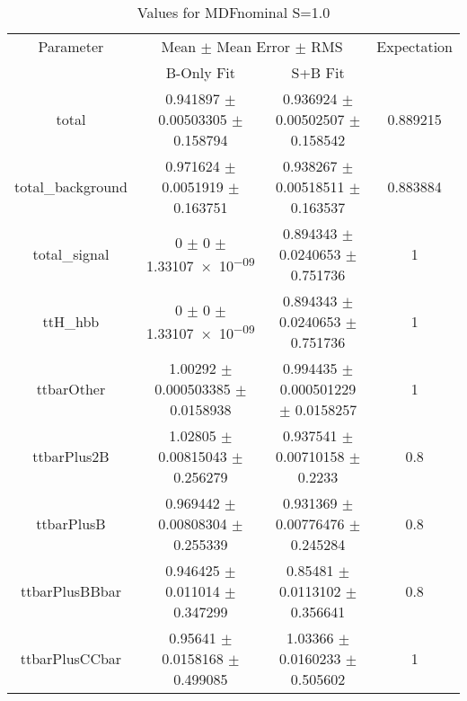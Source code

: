 \begin{table}
\centering
\caption{Values for MDFnominal S=1.0}
\begin{tabular}{cccc}
\toprule
Parameter & \multicolumn{2}{c}{Mean $\pm$ Mean Error $\pm$ RMS} & Expectation\\
 & B-Only Fit & S+B Fit & \\
\midrule
total & \num{0.941897} $\pm$ \num{0.00503305} $\pm$ \num{0.158794} & \num{0.936924} $\pm$ \num{0.00502507} $\pm$ \num{0.158542} & \num{0.889215}\\
total\_background & \num{0.971624} $\pm$ \num{0.0051919} $\pm$ \num{0.163751} & \num{0.938267} $\pm$ \num{0.00518511} $\pm$ \num{0.163537} & \num{0.883884}\\
total\_signal & \num{0} $\pm$ \num{0} $\pm$ \num{1.33107e-09} & \num{0.894343} $\pm$ \num{0.0240653} $\pm$ \num{0.751736} & \num{1}\\
ttH\_hbb & \num{0} $\pm$ \num{0} $\pm$ \num{1.33107e-09} & \num{0.894343} $\pm$ \num{0.0240653} $\pm$ \num{0.751736} & \num{1}\\
ttbarOther & \num{1.00292} $\pm$ \num{0.000503385} $\pm$ \num{0.0158938} & \num{0.994435} $\pm$ \num{0.000501229} $\pm$ \num{0.0158257} & \num{1}\\
ttbarPlus2B & \num{1.02805} $\pm$ \num{0.00815043} $\pm$ \num{0.256279} & \num{0.937541} $\pm$ \num{0.00710158} $\pm$ \num{0.2233} & \num{0.8}\\
ttbarPlusB & \num{0.969442} $\pm$ \num{0.00808304} $\pm$ \num{0.255339} & \num{0.931369} $\pm$ \num{0.00776476} $\pm$ \num{0.245284} & \num{0.8}\\
ttbarPlusBBbar & \num{0.946425} $\pm$ \num{0.011014} $\pm$ \num{0.347299} & \num{0.85481} $\pm$ \num{0.0113102} $\pm$ \num{0.356641} & \num{0.8}\\
ttbarPlusCCbar & \num{0.95641} $\pm$ \num{0.0158168} $\pm$ \num{0.499085} & \num{1.03366} $\pm$ \num{0.0160233} $\pm$ \num{0.505602} & \num{1}\\
\bottomrule
\end{tabular}
\end{table}